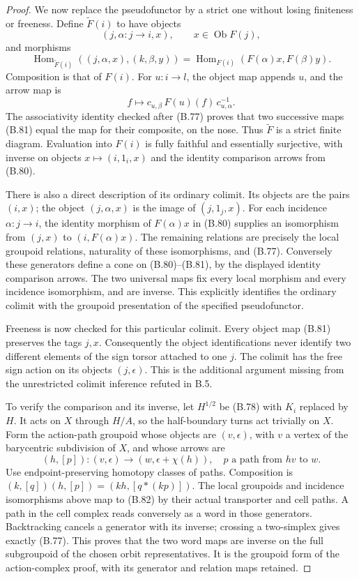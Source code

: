 \begin{proof}
We now replace the pseudofunctor by a strict one without
losing finiteness or freeness.  Define $\widetilde F(i)$
to have objects
\[
 (j,\alpha:j\to i,x),\qquad x\in\operatorname{Ob}F(j),
\]
and morphisms
\[
 \operatorname{Hom}_{\widetilde F(i)}
 ((j,\alpha,x),(k,\beta,y))
 =\operatorname{Hom}_{F(i)}(F(\alpha)x,F(\beta)y).
                                                               \tag{B.80}
\]
Composition is that of $F(i)$.  For $u:i\to l$, the
object map appends $u$, and the arrow map is
\[
 f\longmapsto c_{u,\beta}\,F(u)(f)\,c_{u,\alpha}^{-1}.
                                                               \tag{B.81}
\]
The associativity identity checked after (B.77) proves
that two successive maps (B.81) equal the map for their
composite, on the nose.  Thus $\widetilde F$ is a strict
finite diagram.  Evaluation into $F(i)$ is fully faithful
and essentially surjective, with inverse on objects
$x\mapsto(i,1_i,x)$ and the identity comparison arrows
from (B.80).

There is also a direct description of its ordinary colimit.
Its objects are the pairs $(i,x)$; the object
$(j,\alpha,x)$ is the image of $(j,1_j,x)$.
For each incidence $\alpha:j\to i$, the identity morphism
of $F(\alpha)x$ in (B.80) supplies an isomorphism from
$(j,x)$ to $(i,F(\alpha)x)$.  The remaining relations
are precisely the local groupoid relations, naturality
of these isomorphisms, and (B.77).  Conversely these
generators define a cone on (B.80)--(B.81), by the
displayed identity comparison arrows.  The two universal
maps fix every local morphism and every incidence
isomorphism, and are inverse.  This explicitly identifies
the ordinary colimit with the groupoid presentation of
the specified pseudofunctor.

Freeness is now checked for this particular colimit.
Every object map (B.81) preserves the tags $j,x$.
Consequently the object identifications never identify
two different elements of the sign torsor attached to
one $j$.  The colimit has the free sign action on its
objects $(j,\epsilon)$.  This is the additional argument
missing from the unrestricted colimit inference refuted
in B.5.

To verify the comparison and its inverse, let $H^{1/2}$
be (B.78) with $K_i$ replaced by $H$.  It acts on $X$
through $H/A$, so the half-boundary turns act trivially
on $X$.  Form the action-path groupoid whose objects are
$(v,\epsilon)$, with $v$ a vertex of the barycentric
subdivision of $X$, and whose arrows are
\[
 (h,[p]):(v,\epsilon)\longrightarrow(w,\epsilon+\chi(h)),
 \quad p\text{ a path from }hv\text{ to }w.
                                                               \tag{B.82}
\]
Use endpoint-preserving homotopy classes of paths.
Composition is $(k,[q])(h,[p])=(kh,[q*(kp)])$.
The local groupoids and incidence isomorphisms above
map to (B.82) by their actual transporter and cell paths.
A path in the cell complex reads conversely as a word
in those generators.  Backtracking cancels a generator
with its inverse; crossing a two-simplex gives exactly
(B.77).  This proves that the two word maps are inverse
on the full subgroupoid of the chosen orbit representatives.
It is the groupoid form of the action-complex proof,
with its generator and relation maps retained.


\end{proof}
